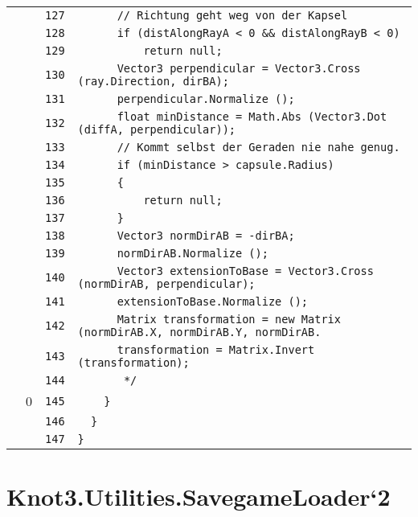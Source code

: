 \documentclass[a4paper,10pt]{article}
\begin{document}
\begin{longtable}[l]{lrrl}
\cellcolor{gray} &  & \verb~127~ & \verb~      // Richtung geht weg von der Kapsel~\\
\cellcolor{gray} &  & \verb~128~ & \verb~      if (distAlongRayA < 0 && distAlongRayB < 0)~\\
\cellcolor{gray} &  & \verb~129~ & \verb~          return null;~\\
\cellcolor{gray} &  & \verb~130~ & \verb~      Vector3 perpendicular = Vector3.Cross (ray.Direction, dirBA);~\\
\cellcolor{gray} &  & \verb~131~ & \verb~      perpendicular.Normalize ();~\\
\cellcolor{gray} &  & \verb~132~ & \verb~      float minDistance = Math.Abs (Vector3.Dot (diffA, perpendicular));~\\
\cellcolor{gray} &  & \verb~133~ & \verb~      // Kommt selbst der Geraden nie nahe genug.~\\
\cellcolor{gray} &  & \verb~134~ & \verb~      if (minDistance > capsule.Radius)~\\
\cellcolor{gray} &  & \verb~135~ & \verb~      {~\\
\cellcolor{gray} &  & \verb~136~ & \verb~          return null;~\\
\cellcolor{gray} &  & \verb~137~ & \verb~      }~\\
\cellcolor{gray} &  & \verb~138~ & \verb~      Vector3 normDirAB = -dirBA;~\\
\cellcolor{gray} &  & \verb~139~ & \verb~      normDirAB.Normalize ();~\\
\cellcolor{gray} &  & \verb~140~ & \verb~      Vector3 extensionToBase = Vector3.Cross (normDirAB, perpendicular);~\\
\cellcolor{gray} &  & \verb~141~ & \verb~      extensionToBase.Normalize ();~\\
\cellcolor{gray} &  & \verb~142~ & \verb~      Matrix transformation = new Matrix (normDirAB.X, normDirAB.Y, normDirAB.~\\
\cellcolor{gray} &  & \verb~143~ & \verb~      transformation = Matrix.Invert (transformation);~\\
\cellcolor{gray} &  & \verb~144~ & \verb~       */~\\
\cellcolor{red} & 0 & \verb~145~ & \verb~    }~\\
\cellcolor{gray} &  & \verb~146~ & \verb~  }~\\
\cellcolor{gray} &  & \verb~147~ & \verb~}~\\
\end{longtable}
\newpage
\section{Knot3.Utilities.SavegameLoader`2}
\end{document}
